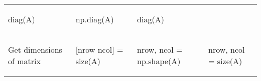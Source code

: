 \documentclass[10pt, landscape]{article}
\newenvironment{Shaded}{}{}
\newcommand{\OperatorTok}[1]{\textcolor[rgb]{0.40,0.40,0.40}{{#1}}}
\newcommand{\NormalTok}[1]{{#1}}
\begin{document}
\begin{multicols*}{2}
\begin{table}[ht]
\begin{tabular}[ ]{@{}llll@{}}
\begin{minipage}[t]{0.23\columnwidth}
\begin{Shaded}
\begin{Highlighting}[]
\NormalTok{diag(A)}
\end{Highlighting}
\end{Shaded}
\strut
\end{minipage} & \begin{minipage}[t]{0.23\columnwidth}\raggedright\strut
\begin{Shaded}
\begin{Highlighting}[]
\NormalTok{np.diag(A)}
\end{Highlighting}
\end{Shaded}
\strut
\end{minipage} & \begin{minipage}[t]{0.20\columnwidth}\raggedright\strut
\begin{Shaded}
\begin{Highlighting}[]
\NormalTok{diag(A)}
\end{Highlighting}
\end{Shaded}
\strut
\end{minipage}\tabularnewline
\begin{minipage}[t]{0.23\columnwidth}\raggedright\strut
Get dimensions of matrix\strut
\end{minipage} & \begin{minipage}[t]{0.23\columnwidth}\raggedright\strut
\begin{Shaded}
\begin{Highlighting}[]
\NormalTok{[nrow ncol] = size(A)}
\end{Highlighting}
\end{Shaded}
\strut
\end{minipage} & \begin{minipage}[t]{0.23\columnwidth}\raggedright\strut
\begin{Shaded}
\begin{Highlighting}[]
\NormalTok{nrow, ncol }\OperatorTok{=} \NormalTok{np.shape(A)}
\end{Highlighting}
\end{Shaded}
\strut
\end{minipage} & \begin{minipage}[t]{0.20\columnwidth}\raggedright\strut
\begin{Shaded}
\begin{Highlighting}[]
\NormalTok{nrow, ncol = size(A)}
\end{Highlighting}
\end{Shaded}
\strut
\end{minipage}\tabularnewline
\bottomrule
\end{tabular}
\end{table}


\end{multicols*}
\end{document}
